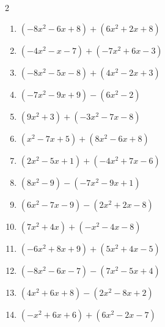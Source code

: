 \begin{multicols}{2}
\begin{enumerate}

  \item $(-8x^{2}-6x+8)+(6x^{2}+2x+8)$


  \item $(-4x^{2}-x-7)+(-7x^{2}+6x-3)$


  \item $(-8x^{2}-5x-8)+(4x^{2}-2x+3)$


  \item $(-7x^{2}-9x+9)-(6x^{2}-2)$


  \item $(9x^{2}+3)+(-3x^{2}-7x-8)$


  \item $(x^{2}-7x+5)+(8x^{2}-6x+8)$


  \item $(2x^{2}-5x+1)+(-4x^{2}+7x-6)$


  \item $(8x^{2}-9)-(-7x^{2}-9x+1)$


  \item $(6x^{2}-7x-9)-(2x^{2}+2x-8)$


  \item $(7x^{2}+4x)+(-x^{2}-4x-8)$


  \item $(-6x^{2}+8x+9)+(5x^{2}+4x-5)$


  \item $(-8x^{2}-6x-7)-(7x^{2}-5x+4)$


  \item $(4x^{2}+6x+8)-(2x^{2}-8x+2)$


  \item $(-x^{2}+6x+6)+(6x^{2}-2x-7)$


\end{enumerate}
\end{multicols}
